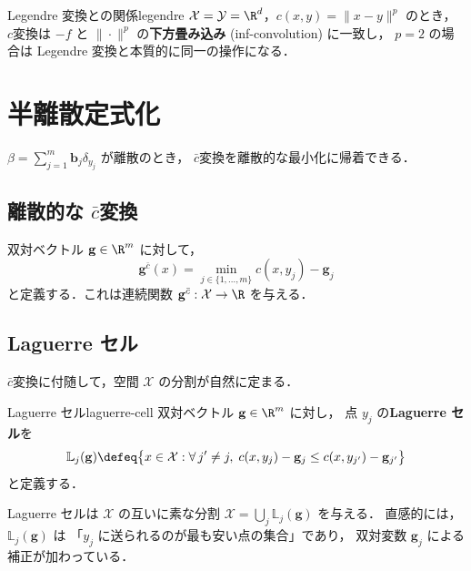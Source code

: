 \begin{remark}{Legendre 変換との関係}{legendre}
$\mathcal{X} = \mathcal{Y} = \R^d$，$c(x, y) = \|x - y\|^p$ のとき，
$c$変換は $-f$ と $\|\cdot\|^p$ の\textbf{下方畳み込み}
(inf-convolution) に一致し，
$p = 2$ の場合は Legendre 変換と本質的に同一の操作になる．
\end{remark}


\section{半離散定式化}\label{sec:semidiscrete-formulation}

$\beta = \sum_{j=1}^m \mathbf{b}_j \delta_{y_j}$ が離散のとき，
$\bar{c}$変換を離散的な最小化に帰着できる．

\subsection{離散的な $\bar{c}$変換}\label{subsec:discrete-cbar}

双対ベクトル $\mathbf{g} \in \R^m$ に対して，
\begin{equation}\label{eq:discrete-cbar}
  \mathbf{g}^{\bar{c}}(x) = \min_{j \in \{1,\ldots,m\}} c(x, y_j) - \mathbf{g}_j
\end{equation}
と定義する．これは連続関数 $\mathbf{g}^{\bar{c}} : \mathcal{X} \to \R$ を与える．

\subsection{Laguerre セル}\label{subsec:laguerre}

$\bar{c}$変換に付随して，空間 $\mathcal{X}$ の分割が自然に定まる．

\begin{definition}{Laguerre セル}{laguerre-cell}
双対ベクトル $\mathbf{g} \in \R^m$ に対し，
点 $y_j$ の\textbf{Laguerre セル}を
\begin{equation}\label{eq:laguerre}
  \mathbb{L}_j(\mathbf{g}) \defeq
  \bigl\{x \in \mathcal{X} :
  \forall\, j' \neq j,\;
  c(x, y_j) - \mathbf{g}_j \leq c(x, y_{j'}) - \mathbf{g}_{j'}\bigr\}
\end{equation}
と定義する．
\end{definition}

Laguerre セルは $\mathcal{X}$ の互いに素な分割
$\mathcal{X} = \bigcup_j \mathbb{L}_j(\mathbf{g})$ を与える．
直感的には，$\mathbb{L}_j(\mathbf{g})$ は
「$y_j$ に送られるのが最も安い点の集合」であり，
双対変数 $\mathbf{g}_j$ による補正が加わっている．

